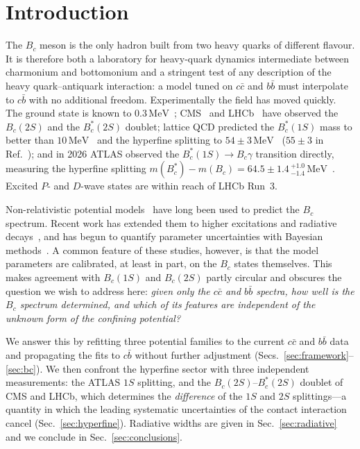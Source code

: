 \documentclass[10pt,twocolumn]{article}
\newcommand{\Bc}{B_c}
\newcommand{\Bcs}{B_c^*}
\newcommand{\cc}{c\bar c}
\newcommand{\bb}{b\bar b}
\newcommand{\cb}{c\bar b}
\newcommand{\MeV}{\,\mathrm{MeV}}
\begin{document}
\section{Introduction}
\label{sec:intro}

The $\Bc$ meson is the only hadron built from two heavy quarks of different flavour.
It is therefore both a laboratory for heavy-quark dynamics intermediate between charmonium and bottomonium and a stringent test of any description of the heavy quark--antiquark interaction: a model tuned on $\cc$ and $\bb$ must interpolate to $\cb$ with no additional freedom.
Experimentally the field has moved quickly.
The ground state is known to $0.3\MeV$~\cite{PDG2026}; CMS~\cite{CMS2019} and LHCb~\cite{LHCb2019} have observed the $\Bc(2S)$ and the $\Bcs(2S)$ doublet; lattice QCD predicted the $\Bcs(1S)$ mass to better than $10\MeV$~\cite{HPQCD2010} and the hyperfine splitting to $54\pm3\MeV$~\cite{Dowdall2012} ($55\pm3$ in Ref.~\cite{Mathur2018}); and in 2026 ATLAS observed the $\Bcs(1S)\to\Bc\gamma$ transition directly, measuring the hyperfine splitting $m(\Bcs)-m(\Bc)=64.5\pm1.4\,^{+1.0}_{-1.4}\MeV$~\cite{ATLAS2026}.
Excited $P$- and $D$-wave states are within reach of LHCb Run~3.

Non-relativistic potential models~\cite{Eichten1994,Godfrey2004,Ebert2003} have long been used to predict the $\Bc$ spectrum.
Recent work has extended them to higher excitations and radiative decays~\cite{Mony2026,BcSpectro2026}, and has begun to quantify parameter uncertainties with Bayesian methods~\cite{Mony2026}.
A common feature of these studies, however, is that the model parameters are calibrated, at least in part, on the $\Bc$ states themselves.
This makes agreement with $\Bc(1S)$ and $\Bc(2S)$ partly circular and obscures the question we wish to address here:
\emph{given only the $\cc$ and $\bb$ spectra, how well is the $\Bc$ spectrum determined, and which of its features are independent of the unknown form of the confining potential?}

We answer this by refitting three potential families to the current $\cc$ and $\bb$ data and propagating the fits to $\cb$ without further adjustment (Secs.~\ref{sec:framework}--\ref{sec:bc}).
We then confront the hyperfine sector with three independent measurements: the ATLAS $1S$ splitting, and the $\Bc(2S)$--$\Bcs(2S)$ doublet of CMS and LHCb, which determines the \emph{difference} of the $1S$ and $2S$ splittings---a quantity in which the leading systematic uncertainties of the contact interaction cancel (Sec.~\ref{sec:hyperfine}).
Radiative widths are given in Sec.~\ref{sec:radiative} and we conclude in Sec.~\ref{sec:conclusions}.
\end{document}
